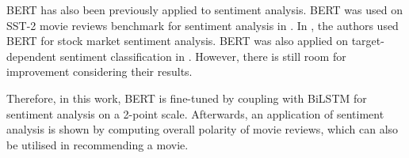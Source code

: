 BERT has also been previously applied to sentiment analysis. BERT was used on SST-2 movie reviews benchmark for sentiment analysis in \cite{munikar2019fine}. In \cite{sousa2019bert}, the authors used BERT for stock market sentiment analysis. BERT was also applied on target-dependent sentiment classification in \cite{gao2019target}. However, there is still room for improvement considering their results. 

Therefore, in this work, BERT is fine-tuned  by coupling with BiLSTM for sentiment analysis on a 2-point scale. Afterwards, an application of sentiment  analysis is shown by computing overall polarity of movie reviews, which can also be utilised in recommending a movie.